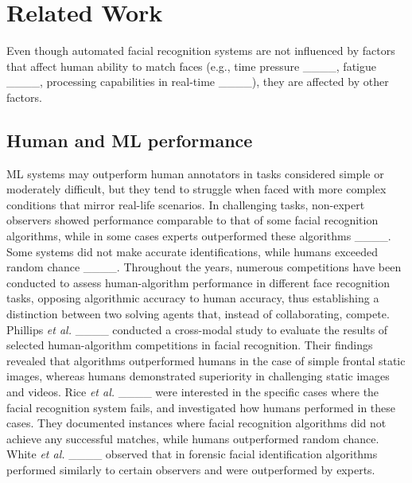 \section{Related Work}
\label{sec:related}

Even though automated facial recognition systems are not influenced by factors that affect human ability to match faces (e.g., time pressure ____, fatigue ____, processing capabilities in real-time ____), they are affected by other factors. %

\subsection{Human and ML performance}

ML systems may outperform human annotators in tasks considered simple or moderately difficult, but they tend to struggle when faced with more complex conditions that mirror real-life scenarios. In challenging tasks, non-expert observers showed performance comparable to that of some facial recognition algorithms, while in some cases experts outperformed these algorithms ____. Some systems did not make accurate identifications, while humans exceeded random chance ____.
%
Throughout the years, numerous competitions have been conducted to assess human-algorithm performance in different face recognition tasks, opposing algorithmic accuracy to human accuracy, thus establishing a distinction between two solving agents that, instead of collaborating, compete. Phillips {\em et al.} ____ conducted a cross-modal study to evaluate the results of selected human-algorithm competitions in facial recognition. Their findings revealed that algorithms outperformed humans in the case of simple frontal static images, whereas humans demonstrated superiority in challenging static images and videos.
Rice {\em et al.} ____ were interested in the specific cases where the facial recognition system fails, and investigated how humans performed in these cases. They documented instances where facial recognition algorithms did not achieve any successful matches, while humans outperformed random chance. White {\em et al.} ____ observed that in forensic facial identification algorithms performed similarly to certain observers and were outperformed by experts. 

